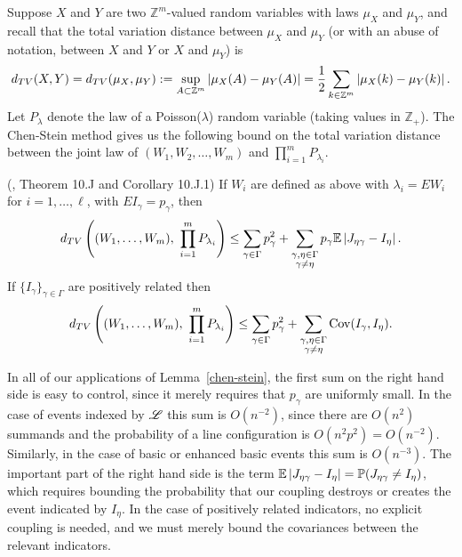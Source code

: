Suppose $X$ and $Y$ are two $\mathbb{Z}^m$-valued random variables with laws $\mu_X$ and $\mu_Y$, and recall that the total variation distance between $\mu_X$ and $\mu_Y$ (or with an abuse of notation, between $X$ and $Y$ or $X$ and $\mu_Y$) is
\begin{align*}
d_{TV}(X,Y) = d_{TV}(\mu_X,\mu_Y) := \sup_{A\subset \mathbb{Z}^m} \left|\mu_X(A) - \mu_Y(A)\right| = \frac{1}{2} \sum_{k \in \mathbb{Z}^m} \left|\mu_X(k) - \mu_Y(k)\right| .
\end{align*}
Let $P_\lambda$ denote the law of a Poisson($\lambda$) random variable (taking values in $\mathbb{Z}_{+}$).  The Chen-Stein method gives us the following bound on the total variation distance between the joint law of $(W_1, W_2, \ldots, W_m)$ and $\prod_{i=1}^m P_{\lambda_i}$.
\begin{lemma}
\label{chen-stein}(\cite{poissonbook}, Theorem 10.J and Corollary 10.J.1)
If $W_i$ are defined as above with $\lambda_i = EW_i$ for $i=1, \ldots,\ell$, with $EI_\gamma = p_\gamma$, then
\begin{align}
\label{cs1}
d_{TV}\left((W_1, \ldots, W_m), \ \prod_{i=1}^m P_{\lambda_i}\right) \leq \sum_{\gamma \in \Gamma} p_\gamma^2 + \sum_{\substack{\gamma, \eta \in\Gamma \\ \gamma\neq\eta}} p_\gamma \mathbb{E}\left|J_{\eta\gamma} - I_\eta\right|.
\end{align}
If $\{I_\gamma\}_{\gamma\in\Gamma}$ are positively related then
\begin{align}
\label{cs2}
d_{TV}\left((W_1, \ldots, W_m), \ \prod_{i=1}^m P_{\lambda_i}\right) \leq \sum_{\gamma \in \Gamma} p_\gamma^2 + \sum_{\substack{\gamma, \eta \in\Gamma \\ \gamma\neq\eta}} \operatorname{Cov}(I_\gamma, I_\eta).
\end{align}
\end{lemma}
\begin{remark}
In all of our applications of Lemma~\ref{chen-stein}, the first sum on the right hand side is easy to control, since it merely requires that $p_\gamma$ are uniformly small.  In the case of events indexed by $\mathscr{L}$ this sum is $O(n^{-2})$, since there are $O(n^2)$ summands and the probability of a line configuration is $O(n^2p^2) = O(n^{-2})$.  Similarly, in the case of basic or enhanced basic events this sum is $O(n^{-3})$.  The important part of the right hand side is the term $\mathbb{E}\left|J_{\eta\gamma} - I_\eta\right| = \mathbb{P}{(J_{\eta\gamma} \neq I_\eta)}{}$, which requires bounding the probability that our coupling destroys or creates the event indicated by $I_\eta$.  In the case of positively related indicators, no explicit coupling is needed, and we must merely bound the covariances between the relevant indicators.
\end{remark}


